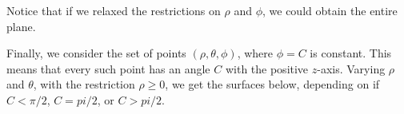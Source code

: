 \documentclass{ximera}
\begin{document}
\begin{image}
\end{image}

Notice that if we relaxed the restrictions on $\rho$ and $\phi$, we could obtain the entire plane.

Finally, we consider the set of points $(\rho, \theta, \phi)$, where $\phi = C$ is constant. This means that every such point has an angle $C$ with the positive $z$-axis. Varying $\rho$ and $\theta$, with the restriction $\rho\geq 0$, we get the surfaces below, depending on if $C<\pi/2$, $C=pi/2$, or $C>pi/2$.
\end{document}
